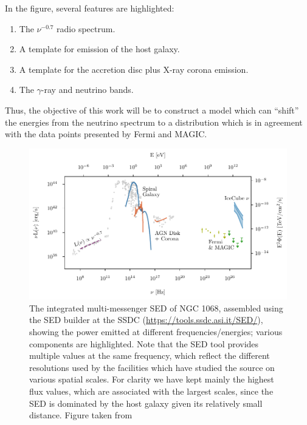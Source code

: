 In the figure, several features are highlighted: 
\begin{enumerate}
    \item The $\nu^{-0.7}$ radio spectrum.
    \item A template for emission of the host galaxy.
    \item A template for the accretion disc plus X-ray corona emission.
    \item The $\gamma$-ray and neutrino bands.
\end{enumerate}

Thus, the objective of this work will be to construct a model which can ``shift'' the energies from the neutrino spectrum to a distribution which is in agreement with the data points presented by Fermi and MAGIC.

\vspace{-2cm}
\begin{figure}[H]
    \centering
    \includegraphics[width=\textwidth]{Figures/NGC1068_SED.pdf}
    \caption{The integrated multi-messenger SED of NGC 1068, assembled using the
    SED builder at the SSDC (\url{https://tools.ssdc.asi.it/SED/}), showing the power emitted at different frequencies/energies; various components are highlighted. Note that the SED tool provides multiple values at the same frequency, which reflect the different resolutions used by the facilities which have studied the source on various spatial scales. For clarity we have kept mainly the highest flux values, which are associated with the largest scales, since the SED is dominated by the host galaxy given its relatively small distance. Figure taken from \cite{padovani2024highenergyneutrinosvicinitysupermassive}}
    \label{fig:NGC1068_SED}
\end{figure}


